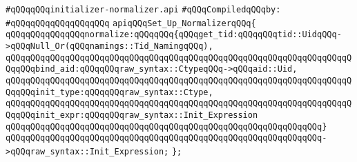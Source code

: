 \label{src/lib/c-kit/src/ast/initializer-normalizer.api}
\verb|#qQQqqQQqinitializer-normalizer.api|\newline
\newline
\verb|#qQQqCompiledqQQqby:|\newline
\verb|#qQQqqQQqqQQqqQQqqQQq|\newline
\newline
\verb|apiqQQqSet_Up_NormalizerqQQq{|\newline
\newline
\verb|qQQqqQQqqQQqqQQqnormalize:qQQqqQQq{qQQqget_tid:qQQqqQQqtid::UidqQQq->qQQqNull_Or(qQQqnamings::Tid_NamingqQQq),|\newline
\verb|qQQqqQQqqQQqqQQqqQQqqQQqqQQqqQQqqQQqqQQqqQQqqQQqqQQqqQQqqQQqqQQqqQQqqQQqqQQqbind_aid:qQQqqQQqraw_syntax::CtypeqQQq->qQQqaid::Uid,|\newline
\verb|qQQqqQQqqQQqqQQqqQQqqQQqqQQqqQQqqQQqqQQqqQQqqQQqqQQqqQQqqQQqqQQqqQQqqQQqqQQqinit_type:qQQqqQQqraw_syntax::Ctype,|\newline
\verb|qQQqqQQqqQQqqQQqqQQqqQQqqQQqqQQqqQQqqQQqqQQqqQQqqQQqqQQqqQQqqQQqqQQqqQQqqQQqinit_expr:qQQqqQQqraw_syntax::Init_Expression|\newline
\verb|qQQqqQQqqQQqqQQqqQQqqQQqqQQqqQQqqQQqqQQqqQQqqQQqqQQqqQQqqQQqqQQq}|\newline
\verb|qQQqqQQqqQQqqQQqqQQqqQQqqQQqqQQqqQQqqQQqqQQqqQQqqQQqqQQqqQQqqQQq->qQQqraw_syntax::Init_Expression;|\newline
\newline
\verb|};|\newline

